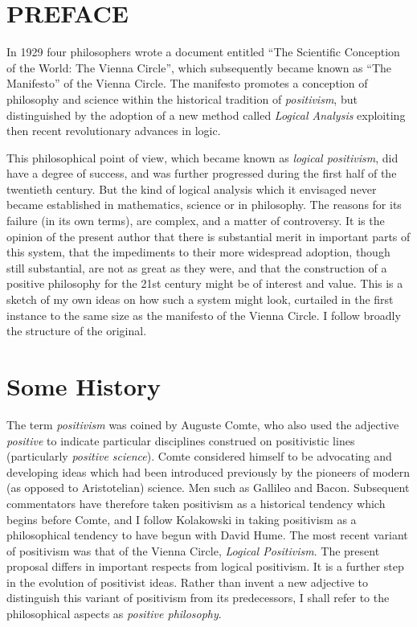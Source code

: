 \section*{PREFACE}

In 1929 four philosophers wrote a document entitled ``The Scientific Conception of the World: The Vienna Circle'', which subsequently became known as ``The Manifesto'' of the Vienna Circle.
The manifesto promotes a conception of philosophy and science within the historical tradition of \emph{positivism}, but distinguished by the adoption of a new method called \emph{Logical Analysis} exploiting then recent revolutionary advances in logic.

This philosophical point of view, which became known as \emph{logical positivism}, did have a degree of success, and was further progressed during the first half of the twentieth century.
But the kind of logical analysis which it envisaged never became established in mathematics, science or in philosophy.
The reasons for its failure (in its own terms), are complex, and a matter of controversy.
It is the opinion of the present author that there is substantial merit in important parts of this system, that the impediments to their more widespread adoption, though still substantial, are not as great as they were, and that the construction of a positive philosophy for the 21st century might be of interest and value.
This is a sketch of my own ideas on how such a system might look, curtailed in the first instance to the same size as the manifesto of the Vienna Circle.
I follow broadly the structure of the original.

\section{Some History}

The term \emph{positivism} was coined by Auguste Comte, who also used the adjective \emph{positive} to indicate particular disciplines construed on positivistic lines (particularly \emph{positive science}).
Comte considered himself to be advocating and developing ideas which had been introduced previously by the pioneers of modern (as opposed to Aristotelian) science.
Men such as Gallileo and Bacon.
Subsequent commentators have therefore taken positivism as a historical tendency which begins before Comte, and I follow Kolakowski in taking positivism as a philosophical tendency to have begun with David Hume.
The most recent variant of positivism was that of the Vienna Circle, \emph{Logical Positivism}.
The present proposal differs in important respects from logical positivism.
It is a further step in the evolution of positivist ideas.
Rather than invent a new adjective to distinguish this variant of positivism from its predecessors, I shall refer to the philosophical aspects as \emph{positive philosophy}.

